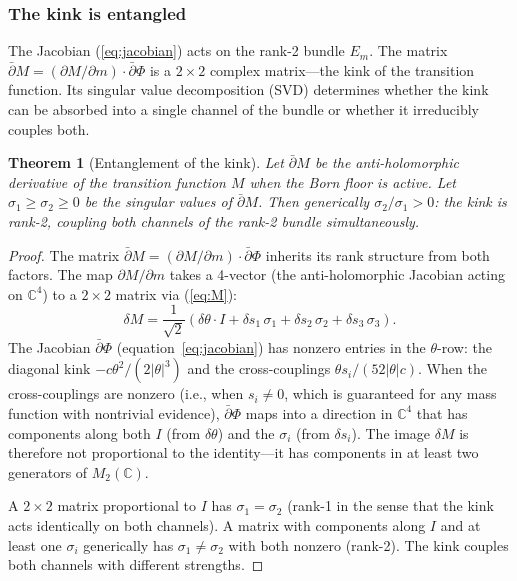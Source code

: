 \documentclass[11pt,a4paper]{article}
\newtheorem{theorem}{Theorem}[section]
\theoremstyle{definition}
\theoremstyle{remark}
\newcommand{\C}{\mathbb{C}}
\newcommand{\dbar}{\bar{\partial}}
\begin{document}
\subsubsection{The kink is entangled}

The Jacobian (\ref{eq:jacobian}) acts on the rank-2 bundle $E_m$. The matrix $\dbar M = (\partial M/\partial m)\cdot\dbar\Phi$ is a $2\times 2$ complex matrix---the kink of the transition function. Its singular value decomposition (SVD) determines whether the kink can be absorbed into a single channel of the bundle or whether it irreducibly couples both.

\begin{theorem}[Entanglement of the kink]\label{thm:entangle}
Let $\dbar M$ be the anti-holomorphic derivative of the transition function $M$ when the Born floor is active. Let $\sigma_1\geq\sigma_2\geq 0$ be the singular values of $\dbar M$. Then generically $\sigma_2/\sigma_1>0$: the kink is rank-2, coupling both channels of the rank-2 bundle simultaneously.
\end{theorem}

\begin{proof}
The matrix $\dbar M = (\partial M/\partial m)\cdot\dbar\Phi$ inherits its rank structure from both factors. The map $\partial M/\partial m$ takes a 4-vector (the anti-holomorphic Jacobian acting on $\C^4$) to a $2\times 2$ matrix via (\ref{eq:M}):
\[
\delta M = \frac{1}{\sqrt{2}}(\delta\theta\cdot I + \delta s_1\,\sigma_1 + \delta s_2\,\sigma_2 + \delta s_3\,\sigma_3).
\]
The Jacobian $\dbar\Phi$ (equation~\ref{eq:jacobian}) has nonzero entries in the $\theta$-row: the diagonal kink $-c\theta^2/(2|\theta|^3)$ and the cross-couplings $\theta s_i/(52|\theta|c)$. When the cross-couplings are nonzero (i.e., when $s_i\neq 0$, which is guaranteed for any mass function with nontrivial evidence), $\dbar\Phi$ maps into a direction in $\C^4$ that has components along both $I$ (from $\delta\theta$) and the $\sigma_i$ (from $\delta s_i$). The image $\delta M$ is therefore not proportional to the identity---it has components in at least two generators of $M_2(\C)$.

A $2\times 2$ matrix proportional to $I$ has $\sigma_1=\sigma_2$ (rank-1 in the sense that the kink acts identically on both channels). A matrix with components along $I$ and at least one $\sigma_i$ generically has $\sigma_1\neq\sigma_2$ with both nonzero (rank-2). The kink couples both channels with different strengths.
\end{proof}
\end{document}
